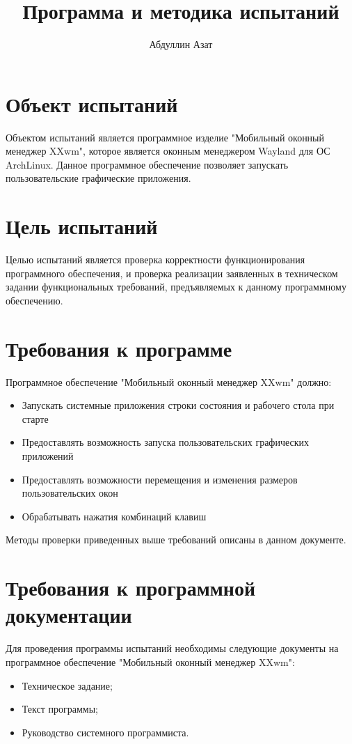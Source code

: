 \documentclass[10pt,a4paper]{report}
\author{Абдуллин Азат}
\title{Программа и методика испытаний}
\begin{document}
	\maketitle
	\renewcommand{\thesection}{\arabic{section}}
	\tableofcontents
	\pagebreak
	
\section{Объект испытаний}
Объектом испытаний является программное изделие "Мобильный оконный менеджер XXwm", которое является оконным менеджером Wayland для ОС ArchLinux. Данное программное обеспечение позволяет запускать пользовательские графические приложения.
		
\section{Цель испытаний}
Целью испытаний является проверка корректности функционирования программного обеспечения, и проверка реализации заявленных в техническом задании функциональных требований, предъявляемых к данному программному обеспечению.
	
\section{Требования к программе}
Программное обеспечение "Мобильный оконный менеджер XXwm" должно:
\begin{itemize}
\item Запускать системные приложения строки состояния и рабочего стола при старте
\item Предоставлять возможность запуска пользовательских графических приложений
\item Предоставлять возможности перемещения и изменения размеров пользовательских окон
\item Обрабатывать нажатия комбинаций клавиш
\end{itemize}
		
Методы проверки приведенных выше требований описаны в данном документе.
		
\section{Требования к программной документации}
Для проведения программы испытаний необходимы следующие документы на программное обеспечение "Мобильный оконный менеджер XXwm":
\begin{itemize}
\item Техническое задание;
\item Текст программы;
\item Руководство системного программиста.
\end{itemize}
	
\end{document}
